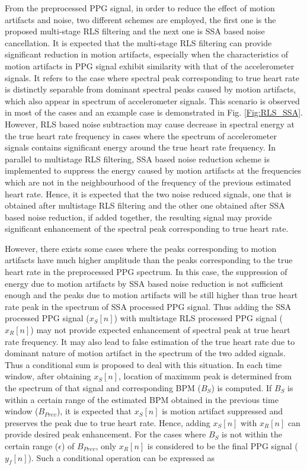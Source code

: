 \documentclass[final,3p,times,authoryear]{elsarticle}
\begin{document}
From the preprocessed PPG signal, in order to reduce the effect of motion artifacts and noise, two different schemes are employed, the first one is the proposed multi-stage RLS filtering and the next one is SSA based noise cancellation. It is expected that the  
multi-stage RLS filtering can provide significant reduction in motion artifacts, especially when the characteristics of motion artifacts in PPG signal exhibit similarity with that of the accelerometer signals. It refers to the case where spectral peak corresponding to true heart rate is distinctly separable from dominant spectral peaks caused by motion artifacts, which also appear in spectrum of accelerometer signals. This scenario is observed in most of the cases and an example case is demonstrated in Fig. \ref{Fig:RLS_SSA}. However, RLS based noise subtraction may cause decrease in spectral energy at the true heart rate frequency in cases where the spectrum of accelerometer signals contains significant energy around the true heart rate frequency. 
In parallel to multistage RLS filtering, SSA based noise reduction scheme is implemented to suppress the energy caused by motion artifacts at the frequencies which are not in the neighbourhood of the frequency of the previous estimated heart rate. Hence, it is expected that the two noise reduced signals, one that is obtained after multistage RLS filtering and the other one obtained after SSA based noise reduction, if added together, the resulting signal may provide significant enhancement of the spectral peak corresponding to true heart rate. 



However, there exists some cases where the peaks corresponding to motion artifacts have much higher amplitude than the peaks corresponding to the true heart rate in the preprocessed PPG spectrum. In this case, the suppression of energy due to motion artifacts by SSA based noise reduction is not sufficient enough and the peaks due to motion artifacts will be still higher than true heart rate peak in the spectrum of SSA processed PPG signal. Thus adding the SSA processed PPG signal ($x_S[n]$) with multistage RLS processed PPG signal ($x_{R}[n]$) may not provide expected enhancement of spectral peak at true heart rate frequency. It may also lead to false estimation of the true heart rate due to dominant nature of motion artifact in the spectrum of the two added signals. Thus a conditional sum is proposed to deal with this situation. In each time window, after obtaining $x_S[n]$, location of maximum peak is determined from the spectrum of that signal and corresponding BPM ($B_S$) is computed. If $B_S$ is within a certain range of the estimated BPM obtained in the previous time window ($B_{Prev}$), it is expected that $x_S[n]$ is motion artifact suppressed and preserves the peak due to true heart rate. Hence, adding $x_S[n]$ with $x_R[n]$ can provide desired peak enhancement. For the cases where $B_S$ is not within the certain range ($\epsilon$) of $B_{Prev}$, only $x_R[n]$ is considered to be the final PPG signal ($y_f[n]$). Such a conditional operation can be expressed as 
\end{document}
